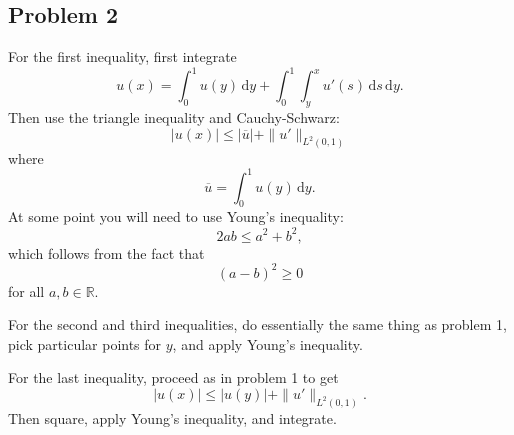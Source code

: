 \documentclass{article}
\theoremstyle{definition}
\theoremstyle{plain}
\newcommand{\R}{\mathbb R}
\renewcommand{\d}{\mathrm d}
\begin{document}
\subsection{Problem 2}
For the first inequality, first integrate 
\begin{equation}
  u(x) = \int_0^1u(y)\,\d y + \int_0^1\int_y^xu'(s)\,\d s\,\d y.
\end{equation}
Then  use the triangle inequality and Cauchy-Schwarz:
\begin{equation}
  |u(x)| \leq |\overline u| + \|u'\|_{L^2(0,1)}
\end{equation}
where 
\begin{equation}
  \overline u = \int_0^1u(y)\,\d y.
\end{equation}
At some point you will need to use Young's inequality:
\begin{equation}
  2ab \leq a^2 + b^2,
\end{equation}
which follows from the fact that 
\begin{equation}
  (a-b)^2 \geq 0
\end{equation}
for all $a, b \in \R$.

For the second and third inequalities, do essentially the same thing as problem 1, pick particular points for $y$, and apply Young's inequality.

For the last inequality, proceed as in problem 1 to get
\begin{equation}
  |u(x)| \leq |u(y)| + \|u'\|_{L^2(0,1)}.
\end{equation}
Then square, apply Young's inequality, and integrate.
\end{document}
